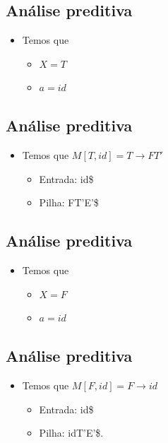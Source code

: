 \documentclass[11pt]{article}
\begin{document}
\subsection*{Análise preditiva}
\label{sec:org04e799d}

\begin{itemize}
\item Temos que
\begin{itemize}
\item \(X = T\)
\item \(a = id\)
\end{itemize}
\end{itemize}
\subsection*{Análise preditiva}
\label{sec:org5c0a91f}

\begin{itemize}
\item Temos que \(M[T,id] = T\to FT'\)
\begin{itemize}
\item Entrada: id\$
\item Pilha: FT'E'\$
\end{itemize}
\end{itemize}
\subsection*{Análise preditiva}
\label{sec:org0a012ef}

\begin{itemize}
\item Temos que
\begin{itemize}
\item \(X = F\)
\item \(a = id\)
\end{itemize}
\end{itemize}
\subsection*{Análise preditiva}
\label{sec:org2c5736e}

\begin{itemize}
\item Temos que \(M[F,id] = F \to id\)
\begin{itemize}
\item Entrada: id\$
\item Pilha: idT'E'\$.
\end{itemize}
\end{itemize}
\end{document}
